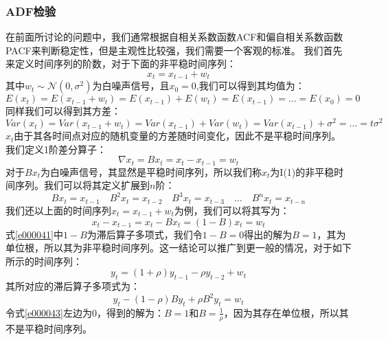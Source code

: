 \subsubsection{ADF检验}
在前面所讨论的问题中，我们通常根据自相关系数函数ACF和偏自相关系数函数PACF来判断稳定性，但是主观性比较强，我们需要一个客观的标准。\newline
我们首先来定义时间序列的阶数，对于下面的非平稳时间序列：
\begin{equation}
x_{t}=x_{t-1}+w_{t}
\label{e000036}
\end{equation}
其中$w_{t} \sim \mathcal{N}(0, \sigma ^{2})$为白噪声信号，且$x_{0}=0$,我们可以得到其均值为：
\begin{equation}
E(x_{t})=E(x_{t-1}+w_{t})=E(x_{t-1})+E(w_{t})=E(x_{t-1})=...=E(x_{0})=0
\label{e000037}
\end{equation}
同样我们可以得到其方差：
\begin{equation}
Var(x_{t})=Var(x_{t-1}+w_{t})=Var(x_{t-1})+Var(w_{t})=Var(x_{t-1})+\sigma ^{2}=...=t\sigma ^{2}
\label{e000038}
\end{equation}
$x_{t}$由于其各时间点对应的随机变量的方差随时间变化，因此不是平稳时间序列。\newline
我们定义1阶差分算子：
\begin{equation}
\nabla x_{t} = Bx_{t}=x_{t}-x_{t-1}=w_{t}
\label{e000039}
\end{equation}
对于$Bx_{t}$为白噪声信号，其显然是平稳时间序列，所以我们称$x_{t}$为I(1)的非平稳时间序列。我们可以将其定义扩展到$n$阶：
\begin{equation}
Bx_{t}=x_{t-1} \quad B^{2}x_{t}=x_{t-2} \quad B^{3}x_{t}=x_{t-3} \quad ...  \quad B^{n}x_{t}=x_{t-n}
\label{e000040}
\end{equation}
我们还以上面的时间序列$x_{t}=x_{t-1}+w_t$为例，我们可以将其写为：
\begin{equation}
x_{t}-x_{t-1}=x_{t}-Bx_{t}=(1-B)x_{t}=w_{t}
\label{e000041}
\end{equation}
式\ref{e000041}中$1-B$为滞后算子多项式，我们令$1-B=0$得出的解为$B=1$，其为单位根，所以其为非平稳时间序列。这一结论可以推广到更一般的情况，对于如下所示的时间序列：
\begin{equation}
y_{t}=(1+\rho)y_{t-1}-\rho y_{t-2}+w_{t}
\label{e000042}
\end{equation}
其所对应的滞后算子多项式为：
\begin{equation}
y_{t}-(1-\rho)By_{t}+\rho B^{2} y_{t}=w_{t}
\label{e000043}
\end{equation}
令式\ref{e000043}左边为0，得到的解为：$B=1$和$B=\frac{1}{\rho}$，因为其存在单位根，所以其不是平稳时间序列。\newline
